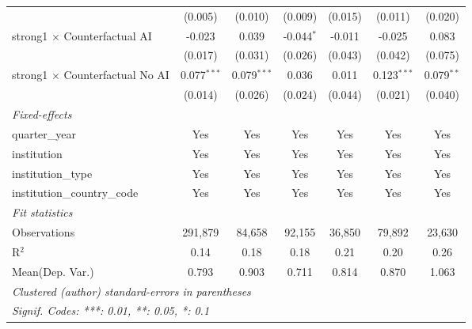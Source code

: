\begin{tabular}{lcccccc}
                                          & (0.005)       & (0.010)       & (0.009)       & (0.015)       & (0.011)       & (0.020)\\   
   strong1 $\times$ Counterfactual AI     & -0.023        & 0.039         & -0.044$^{*}$  & -0.011        & -0.025        & 0.083\\   
                                          & (0.017)       & (0.031)       & (0.026)       & (0.043)       & (0.042)       & (0.075)\\   
   strong1 $\times$ Counterfactual No AI  & 0.077$^{***}$ & 0.079$^{***}$ & 0.036         & 0.011         & 0.123$^{***}$ & 0.079$^{**}$\\   
                                          & (0.014)       & (0.026)       & (0.024)       & (0.044)       & (0.021)       & (0.040)\\   
   \midrule
   \emph{Fixed-effects}\\
   quarter\_year                          & Yes           & Yes           & Yes           & Yes           & Yes           & Yes\\  
   institution                            & Yes           & Yes           & Yes           & Yes           & Yes           & Yes\\  
   institution\_type                      & Yes           & Yes           & Yes           & Yes           & Yes           & Yes\\  
   institution\_country\_code             & Yes           & Yes           & Yes           & Yes           & Yes           & Yes\\  
   \midrule
   \emph{Fit statistics}\\
   Observations                           & 291,879       & 84,658        & 92,155        & 36,850        & 79,892        & 23,630\\  
   R$^2$                                  & 0.14          & 0.18          & 0.18          & 0.21          & 0.20          & 0.26\\  
Mean(Dep. Var.) & 0.793 & 0.903 & 0.711 & 0.814 & 0.870 & 1.063 \\
   \midrule \midrule
   \multicolumn{7}{l}{\emph{Clustered (author) standard-errors in parentheses}}\\
   \multicolumn{7}{l}{\emph{Signif. Codes: ***: 0.01, **: 0.05, *: 0.1}}\\
\end{tabular}
\par\endgroup

